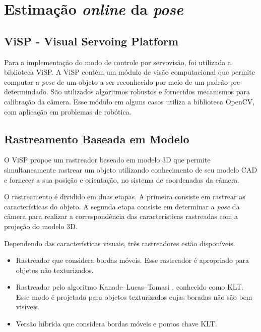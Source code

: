 \chapter{Estimação \textit{online} da \textit{pose}}  \label{chap:pose_est}
\section{ViSP - Visual Servoing Platform}

Para a implementação do modo de controle por servovisão, foi utilizada a biblioteca ViSP. A ViSP contém um módulo de visão computacional que permite computar a \textit{pose} de um objeto a ser reconhecido por meio de um padrão pre-determindado. São utilizados algoritmos robustos e fornecidos mecanismos para calibração da câmera. Esse módulo em alguns casos utiliza a biblioteca OpenCV, com aplicação em problemas de robótica. 
\section{Rastreamento Baseada em Modelo}
O ViSP propoe um rastreador baseado em modelo 3D que permite simultaneamente rastrear um objeto utilizando conhecimento de seu modelo CAD e fornecer a sua posição e  orientação, no sistema de coordenadas da câmera.

O rastreamento é dividido em duas etapas. A primeira consiste em rastrear as características do objeto. A segunda etapa consiste em determinar a \textit{pose} da câmera para realizar a correspondência das características rastreadas com a projeção do modelo 3D.

Dependendo das características visuais, três rastreadores estão disponíveis.
\begin{itemize}
\item Rastreador que considera bordas móveis. Esse rastreador é apropriado para objetos não texturizados.
\item Rastreador pelo algoritmo Kanade–Lucas–Tomasi \citep{tomasi1991detection}, conhecido como KLT. Esse modo é projetado para objetos texturizados cujas boradas não são bem visíveis.
\item Versão híbrida que considera bordas móveis e pontos chave KLT. 
\end{itemize}

